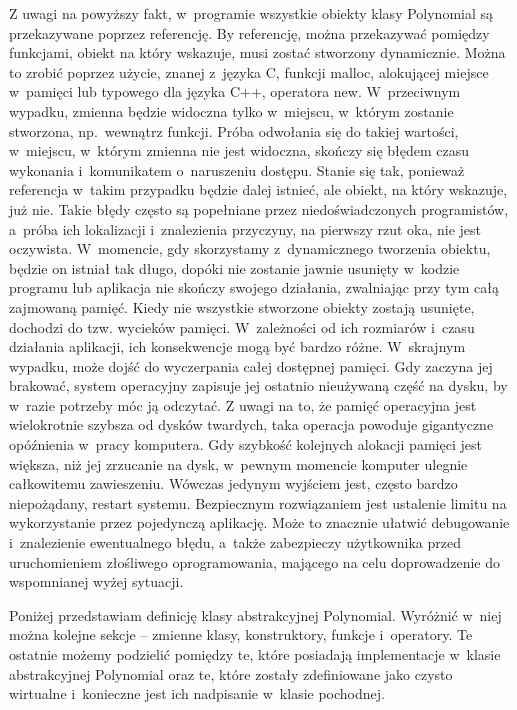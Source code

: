 Z uwagi na powyższy fakt, w~programie wszystkie obiekty klasy Polynomial są przekazywane poprzez referencję. By referencję, można przekazywać pomiędzy funkcjami, obiekt na który wskazuje, musi zostać stworzony dynamicznie. Można to zrobić poprzez użycie, znanej z~języka C, funkcji malloc, alokującej miejsce w~pamięci lub typowego dla języka C++, operatora new. W~przeciwnym wypadku, zmienna będzie widoczna tylko w~miejscu, w~którym zostanie stworzona, np.\ wewnątrz funkcji. Próba odwołania się do takiej wartości, w~miejscu, w~którym zmienna nie jest widoczna, skończy się błędem czasu wykonania i~komunikatem o~naruszeniu dostępu. Stanie się tak, ponieważ referencja w~takim przypadku będzie dalej istnieć, ale obiekt, na który wskazuje, już nie. Takie błędy często są popełniane przez niedoświadczonych programistów, a~próba ich lokalizacji i~znalezienia przyczyny, na pierwszy rzut oka, nie jest oczywista. W~momencie, gdy skorzystamy z~dynamicznego tworzenia obiektu, będzie on istniał tak długo, dopóki nie zostanie jawnie usunięty w~kodzie programu lub aplikacja nie skończy swojego działania, zwalniając przy tym całą zajmowaną pamięć. Kiedy nie wszystkie stworzone obiekty zostają usunięte, dochodzi do tzw. wycieków pamięci. W~zależności od ich rozmiarów i~czasu działania aplikacji, ich konsekwencje mogą być bardzo różne. W~skrajnym wypadku, może dojść do wyczerpania całej dostępnej pamięci. Gdy zaczyna jej brakować, system operacyjny zapisuje jej ostatnio nieużywaną część na dysku, by w~razie potrzeby móc ją odczytać. Z uwagi na to, że pamięć operacyjna jest wielokrotnie szybsza od dysków twardych, taka operacja powoduje gigantyczne opóźnienia w~pracy komputera. Gdy szybkość kolejnych alokacji pamięci jest większa, niż jej zrzucanie na dysk, w~pewnym momencie komputer ulegnie całkowitemu zawieszeniu. Wówczas jedynym wyjściem jest, często bardzo niepożądany, restart systemu. Bezpiecznym rozwiązaniem jest ustalenie limitu na wykorzystanie przez pojedynczą aplikację. Może to znacznie ułatwić debugowanie i~znalezienie ewentualnego błędu, a~także zabezpieczy użytkownika przed uruchomieniem złośliwego oprogramowania, mającego na celu doprowadzenie do wspomnianej wyżej sytuacji.

Poniżej przedstawiam definicję klasy abstrakcyjnej Polynomial. Wyróżnić w~niej można kolejne sekcje -- zmienne klasy, konstruktory, funkcje i~operatory. Te ostatnie możemy podzielić pomiędzy te, które posiadają implementacje w~klasie abstrakcyjnej Polynomial oraz te, które zostały zdefiniowane jako czysto wirtualne i~konieczne jest ich nadpisanie w~klasie pochodnej.

